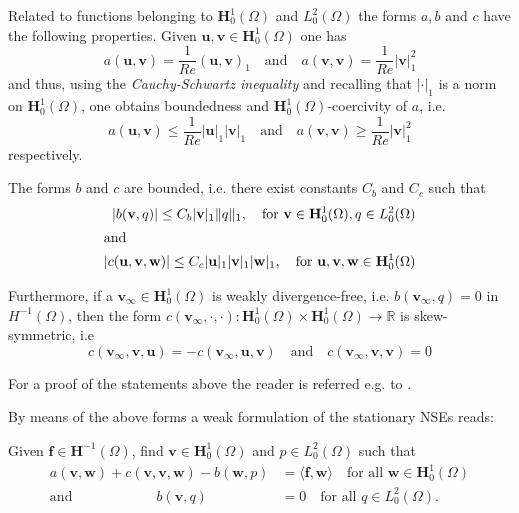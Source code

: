 \documentclass[a4paper,10pt,BCOR=15mm]{scrbook}
\providecommand{\abs}[1]{\lvert#1\rvert}
\providecommand{\norm}[1]{\lVert#1 \rVert}
\providecommand{\dupa}[2]{\langle #1,#2 \rangle}
\providecommand{\andi}[0]{\quad \text{and} \quad}
\begin{document}
Related to functions belonging to $\mathbf H_0^1(\Omega)$ and $L_0^2(\Omega)$ the forms $a,b$ and $c$ have the following properties. Given $\mathbf u,\mathbf v \in \mathbf H_0 ^1 (\Omega)$ one has 
\begin{equation*}
 a(\mathbf u,\mathbf v) = \frac{1}{Re}(\mathbf u,\mathbf v)_1 \andi a(\mathbf v,\mathbf v) = \frac{1}{Re}\abs{\mathbf v}^2_1
\end{equation*}
and thus, using the \textit{Cauchy-Schwartz inequality} and recalling that $\abs{\cdot}_1$ is a norm on $\mathbf H_0^1(\Omega)$, one obtains boundedness and $\mathbf H_0^1(\Omega)$-coercivity of $a$, i.e.
\begin{equation}\label{coea}
 a(\mathbf u,\mathbf v) \leq \frac{1}{Re}\abs{\mathbf u}_1 \abs{\mathbf v}_1 \andi a(\mathbf v,\mathbf v) \geq \frac{1}{Re}\abs{\mathbf v}_1^2
\end{equation}
respectively. 

The forms $b$ and $c$ are bounded, i.e. there exist constants $C_b$ and $C_c$ such that
\begin{align}
 \abs{b(\mathbf v,q)} \leq C_b \abs{\mathbf v}_1 \norm{q}_1, \quad \text{for } \mathbf v \in \mathbf H_0^1(\Omega), q \in L_0^2 (\Omega) \label{stabc}\\
\intertext{and}
\abs{c(\mathbf u,\mathbf v,\mathbf w)} \leq C_c \abs{\mathbf u}_1\abs{\mathbf v}_1\abs{\mathbf w}_1, \quad \text{for } \mathbf {u,v,w} \in \mathbf H_0^1(\Omega)
\end{align}

Furthermore, if a $\mathbf v_\infty \in \mathbf H_0^1(\Omega)$ is weakly divergence-free, i.e. $b(\mathbf v_\infty,q)=0$ in $H^{-1} (\Omega)$, then the form $c(\mathbf v_\infty,\cdot,\cdot):\mathbf H_0^1(\Omega)\times \mathbf H_0^1(\Omega) \rightarrow \mathbb R$ is skew-symmetric, i.e
\begin{equation}\label{skewsym}
  c(\mathbf v_\infty,\mathbf v,\mathbf u)=-c(\mathbf v_\infty,\mathbf u,\mathbf v) \andi  c(\mathbf v_\infty,\mathbf v,\mathbf v)=0
\end{equation}

For a proof of the statements above the reader is referred e.g. to \cite{layt}.

By means of the above forms a weak formulation of the stationary NSEs reads: 
\begin{prob}\label{wnsestat}
Given $\mathbf f \in \mathbf H ^{-1}(\Omega)$, find $\mathbf v \in \mathbf H_0^1(\Omega)$ and $p \in L_0^2(\Omega)$ such that
\begin{subequations}
\begin{align*}
 a(\mathbf v, \mathbf w) + c(\mathbf v,\mathbf v, \mathbf w)-b(\mathbf w, p)&=\dupa{\mathbf f}{ \mathbf w} \quad \text{for all } \mathbf w \in \mathbf H_0^1(\Omega) \\
\text{and} \quad \quad \quad \quad \quad \quad b(\mathbf v, q) &= 0 \quad \text{for all } q \in L_0^2(\Omega).
\end{align*}
\end{subequations}
\end{prob}
\end{document}
